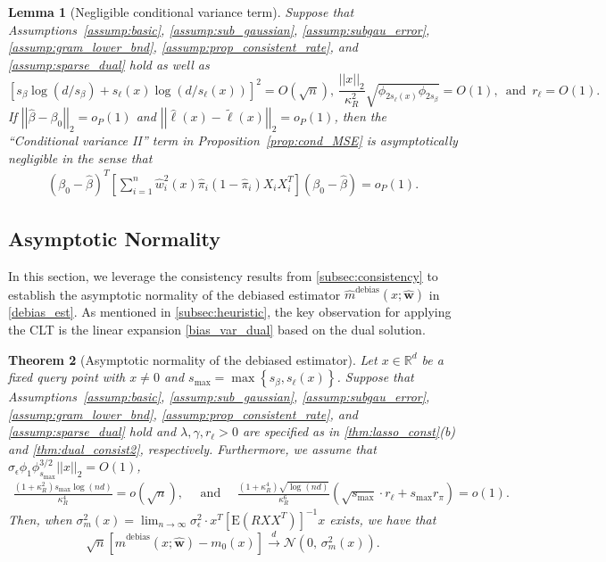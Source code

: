 \documentclass[ejsv2,noshowframe]{imsart}
\theoremstyle{plain}
\newtheorem{theorem}{Theorem}[section]
\newtheorem{lemma}[theorem]{Lemma}
\theoremstyle{definition}
\theoremstyle{remark}
\newcommand{\norm}[1]{\left|\left| #1 \right|\right|}
\renewcommand{\hat}{\widehat}
\renewcommand{\tilde}{\widetilde}
\begin{document}
\begin{lemma}[Negligible conditional variance term]
	\label{lem:negligible_cond_var}
	Suppose that Assumptions~\ref{assump:basic}, \ref{assump:sub_gaussian}, \ref{assump:subgau_error}, \ref{assump:gram_lower_bnd}, \ref{assump:prop_consistent_rate}, and \ref{assump:sparse_dual} hold
	as well as 
	$$\left[s_{\beta} \log(d/s_{\beta}) + s_{\ell}(x) \log(d/s_{\ell}(x))\right]^2 =O\left(\sqrt{n}\right), \, \frac{\norm{x}_2}{\kappa_R^2}\sqrt{\phi_{2s_{\ell}(x)} \phi_{2s_{\beta}}} = O(1), \, \text{ and } \, r_{\ell}=O(1).$$
	If $\norm{\hat{\beta}-\beta_0}_2=o_P(1)$ and $\norm{\hat{\ell}(x) - \tilde{\ell}(x)}_2 =o_P(1)$, then the ``Conditional variance II'' term in Proposition~\ref{prop:cond_MSE} is asymptotically negligible in the sense that
	\begin{align*}
		\left(\beta_0 - \hat{\beta}\right)^T \left[\sum_{i=1}^n \hat{w}_i^2(x)\hat{\pi}_i\left(1-\hat{\pi}_i\right)X_iX_i^T \right] \left(\beta_0 - \hat{\beta}\right) =o_P(1).
	\end{align*} 
\end{lemma}


\subsection{Asymptotic Normality}
\label{subsec:asymp_normal}

In this section, we leverage the consistency results from \autoref{subsec:consistency} to establish the asymptotic normality of the debiased estimator $\hat{m}^{\text{debias}}(x;\hat{\bm{w}})$ in \eqref{debias_est}. As mentioned in \autoref{subsec:heuristic}, the key observation for applying the CLT is the linear expansion \eqref{bias_var_dual} based on the dual solution.

\begin{theorem}[Asymptotic normality of the debiased estimator]
	\label{thm:asym_normal}
	Let $x\in \mathbb{R}^d$ be a fixed query point with $x\neq 0$ and $s_{\max}=\max\left\{s_{\beta},s_{\ell}(x)\right\}$. Suppose that Assumptions~\ref{assump:basic}, \ref{assump:sub_gaussian}, \ref{assump:subgau_error}, \ref{assump:gram_lower_bnd}, \ref{assump:prop_consistent_rate}, and \ref{assump:sparse_dual} hold and $\lambda, \gamma, r_{\ell} >0$ are specified as in \autoref{thm:lasso_const}(b) and \autoref{thm:dual_consist2}, respectively. Furthermore, we assume that $\sigma_{\epsilon}\phi_1\phi_{s_{\max}}^{3/2}\norm{x}_2=O(1)$,
	\begin{align}
		\label{rate_required}
		\frac{(1+\kappa_R^2)s_{\max}\log(nd)}{\kappa_R^4} = o\left(\sqrt{n}\right), \quad \text{ and }  \quad \frac{(1+\kappa_R^4)\sqrt{\log(nd)}}{\kappa_R^6}\left(\sqrt{s_{\max}}\cdot r_{\ell} +s_{\max}r_{\pi}\right)=o(1).
	\end{align}
	Then, when $\sigma_m^2(x) = \lim_{n\to\infty} \sigma_{\epsilon}^2 \cdot x^T\left[\mathrm{E}\left(R XX^T\right)\right]^{-1}x$ exists, we have that
	$$\sqrt{n}\left[\hat{m}^{\mathrm{debias}}(x;\hat{\bm{w}}) - m_0(x)\right] \stackrel{d}{\to} \mathcal{N}\left(0,\, \sigma_m^2(x) \right).$$
\end{theorem}
\end{document}
